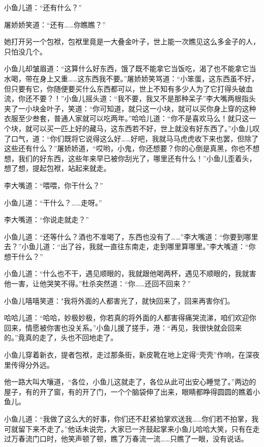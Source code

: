 \documentclass[12pt,oneside]{book}
\begin{document}
小鱼儿道：``还有什么？''

屠娇娇笑道：``还有\ldots\ldots 你瞧瞧？''

她打开另一个包袱，包袱里竟是一大叠金叶子，世上能一次瞧见这么多金子的人，只怕没几个。

小鱼儿却皱眉道：``这算什么好东西，饿了既不能拿它当饭吃，渴了也不能拿它当水喝，带在身上又重\ldots\ldots 这东西我不要。''屠娇娇笑骂道：``小笨蛋，这东西虽不好，但只要有它，你随便要买什么东西都可以，世上不知有多少人为了它打得头破血流，你还不要？！''小鱼儿摇头道：``我不要，我又不是那种呆子''李大嘴两根指头夹了一小块金叶子，笑道：``你可知道，就只这一小块，就可以买你身上穿的这种衣服至少叁套，普通人家就可以吃两年。''哈哈儿道：``你不是喜欢马么！就只这一个块，就可以买一匹上好的藏马，这东西若不好，世上就没有好东西了。''小鱼儿叹了口气，道：``你们既将它说得这么好\ldots\ldots 好吧，我就马马虎虎收下来也罢，但除了这些还有什么？''屠娇娇道，``哎哟，小鬼，你还想要？你的心倒是真黑，你也不想想，我们的好东西，这些年来早已被你刮光了，哪里还有什么！''小鱼儿歪着头，想了想，提起包袱，站起来就走。

李大嘴道：``喂喂，你干什么？''

小鱼儿道：``干什么？\ldots\ldots 走呀。''

李大嘴道：``你说走就走？''

小鱼儿道：``还等什么？酒也不准喝了，东西也没有了\ldots\ldots{}''李大嘴道：``你要到哪里去？''小鱼儿道：``出了谷，我就一直往东南走，走到哪里算哪里。''李大嘴道：``你想干什么？''

小鱼儿道：``什么也不干，遇见顺眼的，我就跟他喝两杯，遇见不顺眼的，我就害他一害，让他哭笑不得。''杜杀突然道：``你\ldots\ldots 还回不回来？''

小鱼儿嘻嘻笑道："我将外面的人都害光了，就快回来了，回来再害你们。

哈哈儿道：``哈哈，妙极妙极，你若真的将外面的人都害得痛哭流涕，咱们欢迎你回来，情愿被你害也没关系。''小鱼儿援了搓手，港：``再见，我很快就会回来的。''竟真的走了，头也不回地走了。

小鱼儿穿着新衣，提者包袱，走过那条街，新皮靴在地上定得``壳壳''作响，在深夜里传得分外远。

他一路大叫大嚷道，``各位，小鱼儿这就走了，各位从此可出安心睡觉了。''两边的屋子，有的开了窗，有的开了门，一个个脑袋伸了出来，眼睛都睁得圆圆的瞧着小鱼儿。

小鱼儿道：``我做了这么大的好事，你们还不赶紧拍掌欢送我\ldots\ldots 你们若不拍掌，我可就留下来不走了。''他话未说完，大家已一齐鼓起掌来小鱼儿哈哈大笑，只有在走过万春流门口时，他笑声顿了顿，瞧了万春流一流\ldots\ldots 只瞧了一眼，没有说话。
\end{document}
